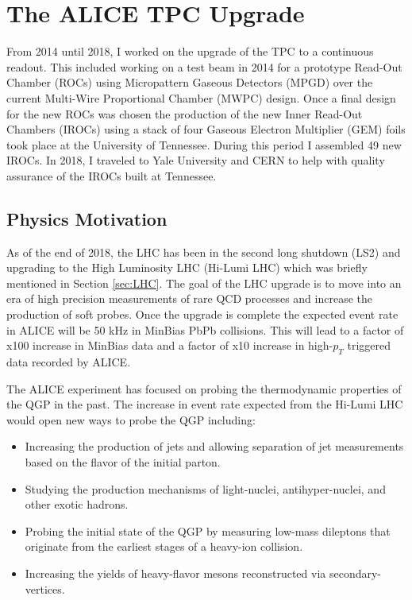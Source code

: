 \chapter{The ALICE TPC Upgrade} \label{ch:tpcu}

From 2014 until 2018, I worked on the upgrade of the TPC to a continuous readout.  This included working on a test beam in 2014 for a prototype Read-Out Chamber (ROCs) using Micropattern Gaseous Detectors (MPGD) over the current Multi-Wire Proportional Chamber (MWPC) design.  Once a final design for the new ROCs was chosen the production of the new Inner Read-Out Chambers (IROCs) using a stack of four Gaseous Electron Multiplier (GEM) foils took place at the University of Tennessee.  During this period I assembled 49 new IROCs.  In 2018, I traveled to Yale University and CERN to help with quality assurance of the IROCs built at Tennessee.


\section{Physics Motivation}
As of the end of 2018, the LHC has been in the second long shutdown (LS2) and upgrading to the High Luminosity LHC (Hi-Lumi LHC)\cite{Apollinari:2015bam} which was briefly mentioned in Section \ref{sec:LHC}.  The goal of the LHC upgrade is to move into an era of high precision measurements of rare QCD processes and increase the production of soft probes.  Once the upgrade is complete the expected event rate in ALICE will be 50 kHz in MinBias PbPb collisions.  This will lead to a factor of x100 increase in MinBias data and a factor of x10 increase in high-$p_{T}$ triggered data recorded by ALICE.

The ALICE experiment has focused on probing the thermodynamic properties of the QGP in the past.  The increase in event rate expected from the Hi-Lumi LHC would open new ways to probe the QGP including\cite{Abelev:1475243}:

\begin{itemize}
\item Increasing the production of jets and allowing separation of jet measurements based on the flavor of the initial parton.
\item Studying the production mechanisms of light-nuclei, antihyper-nuclei, and other exotic hadrons.
\item Probing the initial state of the QGP by measuring low-mass dileptons that originate from the earliest stages of a heavy-ion collision.
\item Increasing the yields of heavy-flavor mesons reconstructed via secondary-vertices. 
\end{itemize}

